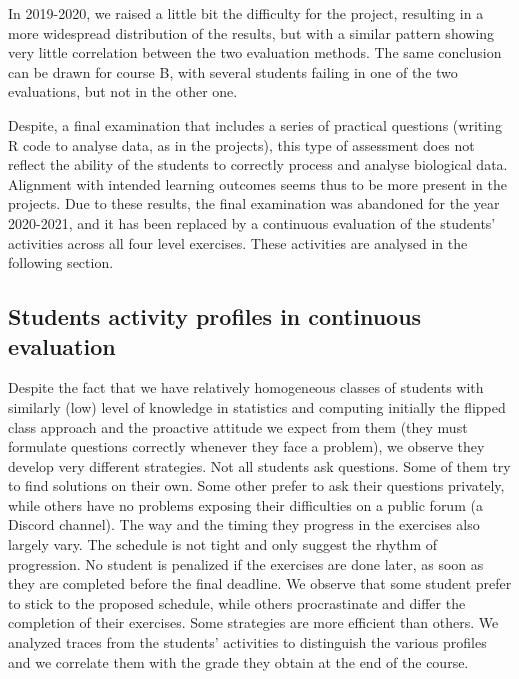 \documentclass{aims}
\theoremstyle{definition}
\begin{document}
In 2019-2020, we raised a little bit the difficulty for the project,
resulting in a more widespread distribution of the results, but with a
similar pattern showing very little correlation between the two
evaluation methods. The same conclusion can be drawn for course B, with
several students failing in one of the two evaluations, but not in the
other one.

Despite, a final examination that includes a series of practical
questions (writing R code to analyse data, as in the projects), this
type of assessment does not reflect the ability of the students to
correctly process and analyse biological data. Alignment with intended
learning outcomes seems thus to be more present in the projects. Due to
these results, the final examination was abandoned for the year
2020-2021, and it has been replaced by a continuous evaluation of the
students' activities across all four level exercises. These activities
are analysed in the following section.

\hypertarget{students-activity-profiles-in-continuous-evaluation}{%
\subsection{Students activity profiles in continuous
evaluation}\label{students-activity-profiles-in-continuous-evaluation}}

Despite the fact that we have relatively homogeneous classes of students
with similarly (low) level of knowledge in statistics and computing
initially the flipped class approach and the proactive attitude we
expect from them (they must formulate questions correctly whenever they
face a problem), we observe they develop very different strategies. Not
all students ask questions. Some of them try to find solutions on their
own. Some other prefer to ask their questions privately, while others
have no problems exposing their difficulties on a public forum (a
Discord channel). The way and the timing they progress in the exercises
also largely vary. The schedule is not tight and only suggest the rhythm
of progression. No student is penalized if the exercises are done later,
as soon as they are completed before the final deadline. We observe that
some student prefer to stick to the proposed schedule, while others
procrastinate and differ the completion of their exercises. Some
strategies are more efficient than others. We analyzed traces from the
students' activities to distinguish the various profiles and we
correlate them with the grade they obtain at the end of the course.
\end{document}
